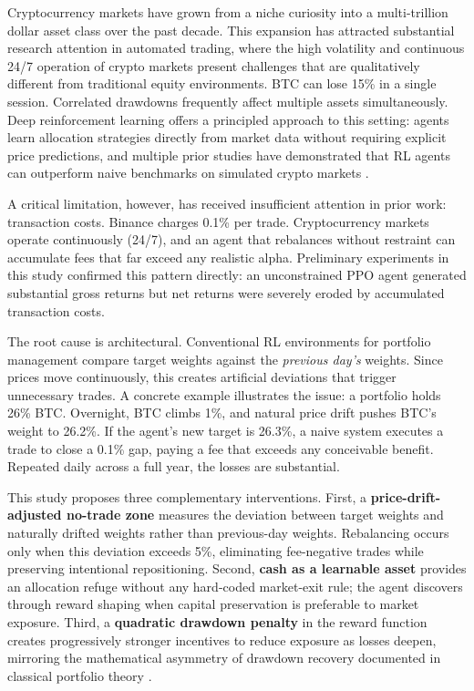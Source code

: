 \documentclass[pdflatex,sn-mathphys-num]{sn-jnl}
\begin{document}
Cryptocurrency markets have grown from a niche curiosity into a multi-trillion
dollar asset class over the past decade. This expansion has attracted substantial
research attention in automated trading, where the high volatility and continuous
24/7 operation of crypto markets present challenges that are qualitatively
different from traditional equity environments. BTC can lose 15\% in a single
session. Correlated drawdowns frequently affect multiple assets simultaneously.
Deep reinforcement learning offers a principled approach to this setting: agents
learn allocation strategies directly from market data without requiring explicit
price predictions, and multiple prior studies have demonstrated that RL agents
can outperform naive benchmarks on simulated crypto markets
\cite{jiang2017deep,betancourt2021deep}.

A critical limitation, however, has received insufficient attention in prior work:
transaction costs. Binance charges 0.1\% per trade. Cryptocurrency markets
operate continuously (24/7), and an agent that rebalances without restraint can
accumulate fees that far exceed any realistic alpha. Preliminary experiments in
this study confirmed this pattern directly: an unconstrained PPO agent generated
substantial gross returns but net returns were severely eroded by accumulated
transaction costs.

The root cause is architectural. Conventional RL environments for portfolio
management compare target weights against the \emph{previous day's} weights.
Since prices move continuously, this creates artificial deviations that trigger
unnecessary trades. A concrete example illustrates the issue: a portfolio holds
26\% BTC. Overnight, BTC climbs 1\%, and natural price drift pushes BTC's weight
to 26.2\%. If the agent's new target is 26.3\%, a naive system executes a trade
to close a 0.1\% gap, paying a fee that exceeds any conceivable benefit.
Repeated daily across a full year, the losses are substantial.

This study proposes three complementary interventions. First, a
\textbf{price-drift-adjusted no-trade zone} measures the deviation between
target weights and naturally drifted weights rather than previous-day weights.
Rebalancing occurs only when this deviation exceeds 5\%, eliminating
fee-negative trades while preserving intentional repositioning. Second,
\textbf{cash as a learnable asset} provides an allocation refuge without
any hard-coded market-exit rule; the agent discovers through reward shaping
when capital preservation is preferable to market exposure. Third, a
\textbf{quadratic drawdown penalty} in the reward function creates
progressively stronger incentives to reduce exposure as losses deepen,
mirroring the mathematical asymmetry of drawdown recovery documented in
classical portfolio theory \cite{grossman1993portfolio}.
\end{document}
